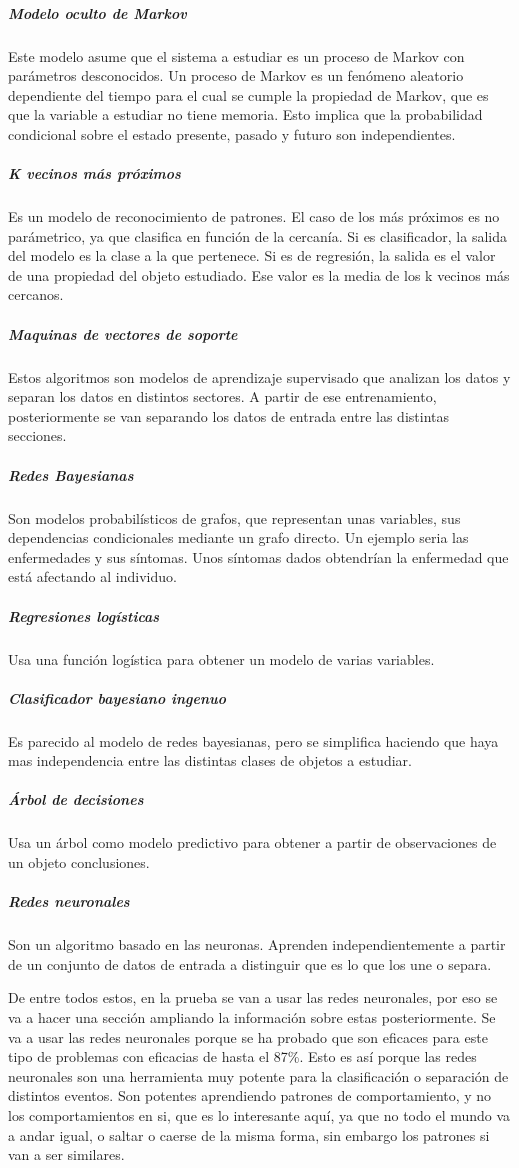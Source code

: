 \documentclass[12pt]{article}
\numberwithin{equation}{section}
\begin{document}
\subparagraph{Modelo oculto de Markov} Este modelo asume que el sistema a estudiar es un proceso de Markov con parámetros desconocidos. Un proceso de Markov es un fenómeno aleatorio dependiente del tiempo para el cual se cumple la propiedad de Markov, que es que la variable a estudiar no tiene memoria. Esto implica que la probabilidad condicional sobre el estado presente, pasado y futuro son independientes.

\subparagraph{K vecinos más próximos} Es un modelo de reconocimiento de patrones. El caso de los más próximos es no parámetrico, ya que clasifica en función de la cercanía. Si es clasificador, la salida del modelo es la clase a la que pertenece. Si es de regresión, la salida es el valor de una propiedad del objeto estudiado. Ese valor es la media de los k vecinos más cercanos.

\subparagraph{Maquinas de vectores de soporte} Estos algoritmos son modelos de aprendizaje supervisado que analizan los datos y separan los datos en distintos sectores. A partir de ese entrenamiento, posteriormente se van separando los datos de entrada entre las distintas secciones.

\subparagraph{Redes Bayesianas} Son modelos probabilísticos de grafos, que representan unas variables, sus dependencias condicionales mediante un grafo directo. Un ejemplo seria las enfermedades y sus síntomas. Unos síntomas dados obtendrían la enfermedad que está afectando al individuo.

\subparagraph{Regresiones logísticas} Usa una función logística para obtener un modelo de varias variables.

\subparagraph{Clasificador bayesiano ingenuo} Es parecido al modelo de redes bayesianas, pero se simplifica haciendo que haya mas independencia entre las distintas clases de objetos a estudiar.

\subparagraph{Árbol de decisiones} Usa un árbol como modelo predictivo para obtener a partir de observaciones de un objeto conclusiones.

\subparagraph{Redes neuronales} Son un algoritmo basado en las neuronas. Aprenden independientemente a partir de un conjunto de datos de entrada a distinguir que es lo que los une o separa.

De entre todos estos, en la prueba se van a usar las redes neuronales, por eso se va a hacer una sección ampliando la información sobre estas posteriormente. Se va a usar las redes neuronales porque se ha probado que son eficaces para este tipo de problemas\cite{s131013099} con eficacias de hasta el 87\%. Esto es así porque las redes neuronales son una herramienta muy potente para la clasificación o separación de distintos eventos. Son potentes aprendiendo patrones de comportamiento, y no los comportamientos en si, que es lo interesante aquí, ya que no todo el mundo va a andar igual, o saltar o caerse de la misma forma, sin embargo los patrones si van a ser similares.
\end{document}
